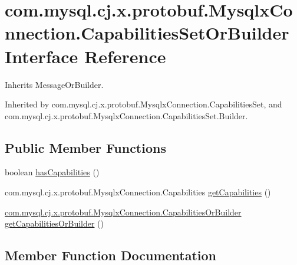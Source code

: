 \hypertarget{interfacecom_1_1mysql_1_1cj_1_1x_1_1protobuf_1_1_mysqlx_connection_1_1_capabilities_set_or_builder}{}\section{com.\+mysql.\+cj.\+x.\+protobuf.\+Mysqlx\+Connection.\+Capabilities\+Set\+Or\+Builder Interface Reference}
\label{interfacecom_1_1mysql_1_1cj_1_1x_1_1protobuf_1_1_mysqlx_connection_1_1_capabilities_set_or_builder}


Inherits Message\+Or\+Builder.



Inherited by com.\+mysql.\+cj.\+x.\+protobuf.\+Mysqlx\+Connection.\+Capabilities\+Set, and com.\+mysql.\+cj.\+x.\+protobuf.\+Mysqlx\+Connection.\+Capabilities\+Set.\+Builder.

\subsection*{Public Member Functions}
\begin{DoxyCompactItemize}
\item 
boolean \mbox{\hyperlink{interfacecom_1_1mysql_1_1cj_1_1x_1_1protobuf_1_1_mysqlx_connection_1_1_capabilities_set_or_builder_a12040ce48f49a5060824af831a846cd2}{has\+Capabilities}} ()
\item 
com.\+mysql.\+cj.\+x.\+protobuf.\+Mysqlx\+Connection.\+Capabilities \mbox{\hyperlink{interfacecom_1_1mysql_1_1cj_1_1x_1_1protobuf_1_1_mysqlx_connection_1_1_capabilities_set_or_builder_aeba6623cd70ca1c46a261f002a942de1}{get\+Capabilities}} ()
\item 
\mbox{\hyperlink{interfacecom_1_1mysql_1_1cj_1_1x_1_1protobuf_1_1_mysqlx_connection_1_1_capabilities_or_builder}{com.\+mysql.\+cj.\+x.\+protobuf.\+Mysqlx\+Connection.\+Capabilities\+Or\+Builder}} \mbox{\hyperlink{interfacecom_1_1mysql_1_1cj_1_1x_1_1protobuf_1_1_mysqlx_connection_1_1_capabilities_set_or_builder_aedd36bd8c2a7685312aed58db6b88702}{get\+Capabilities\+Or\+Builder}} ()
\end{DoxyCompactItemize}


\subsection{Member Function Documentation}
\mbox{\label{interfacecom_1_1mysql_1_1cj_1_1x_1_1protobuf_1_1_mysqlx_connection_1_1_capabilities_set_or_builder_aeba6623cd70ca1c46a261f002a942de1}} 
